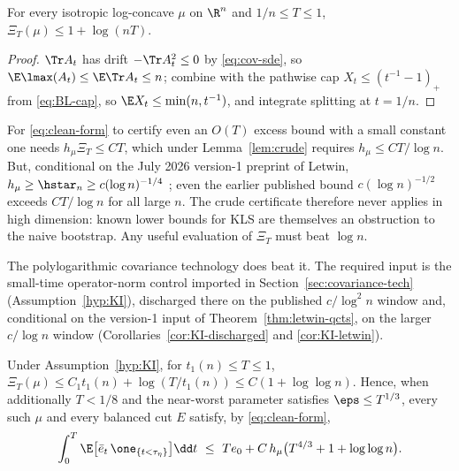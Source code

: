\documentclass[../../main.tex]{subfiles}
\begin{document}
\begin{lemma}
\label{lem:crude}
For every isotropic log-concave $\mu$ on $\R^n$ and $1/n\le T\le1$,
$\Xi_T(\mu)\le1+\log(nT)$.
\end{lemma}

\begin{proof}
$\Tr A_t$ has drift $-\Tr A_t^2\le0$ by \eqref{eq:cov-sde}, so
$\E\lmax(A_t)\le\E\Tr A_t\le n$; combine with the pathwise cap
$X_t\le(t^{-1}-1)_+$ from \eqref{eq:BL-cap}, so $\E X_t\le\min(n,t^{-1})$, and integrate
splitting at $t=1/n$.
\end{proof}

\begin{remark}
\label{rem:insufficiency}
For \eqref{eq:clean-form} to certify even an $O(T)$ excess bound with a small constant one
needs $h_\mu\Xi_T\le CT$, which under Lemma~\ref{lem:crude} requires $h_\mu\le CT/\log n$. But,
conditional on the July 2026 version-1 preprint of Letwin,
$h_\mu\ge\hstar_n\ge c(\log n)^{-1/4}$ \cite{Letwin2026QuadraticKLS}; even the earlier published
bound $c(\log n)^{-1/2}$ \cite{Klartag2023Logarithmic} exceeds $CT/\log n$ for all large $n$.
The crude certificate therefore never applies in high dimension: known lower bounds for KLS are
themselves an obstruction to the naive bootstrap. Any useful evaluation of $\Xi_T$ must beat
$\log n$.
\end{remark}

The polylogarithmic covariance technology does beat it. The required input is the small-time
operator-norm control imported in Section~\ref{sec:covariance-tech}
(Assumption~\ref{hyp:KI}), discharged there on the published $c/\log^2 n$ window and, conditional
on the version-1 input of Theorem~\ref{thm:letwin-qcts}, on the larger $c/\log n$ window
(Corollaries~\ref{cor:KI-discharged} and \ref{cor:KI-letwin}).

\begin{corollary}
\label{cor:loglog}
Under Assumption~\ref{hyp:KI}, for $t_1(n)\le T\le1$,
$\Xi_T(\mu)\le C_1t_1(n)+\log(T/t_1(n))\le C(1+\log\log n)$. Hence, when additionally
$T<1/8$ and the near-worst parameter satisfies $\eps\le T^{1/3}$, every such $\mu$ and every
balanced cut $E$ satisfy, by \eqref{eq:clean-form},
\begin{equation}\label{eq:loglog-supply}
  \int_0^T\E\bigl[\bar e_t\,\one_{\{t<\tau_\eta\}}\bigr]\dd t
  \ \le\ Te_0+C\,h_\mu\bigl(T^{4/3}+1+\log\log n\bigr).
\end{equation}
\end{corollary}
\end{document}
